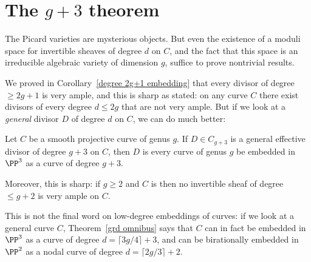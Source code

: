 \section{The $g+3$ theorem}\label{g+3 section}

The Picard varieties are mysterious objects.  But even the 
existence of
a  moduli space for invertible sheaves of degree $d$ on $C$, and 
the fact
that this space is an irreducible algebraic variety of dimension $g$,
suffice to prove nontrivial results. 

We proved in Corollary~\ref{degree 2g+1 embedding} that every divisor
of degree $\geq 2g+1$ is very ample, and this is sharp as stated: on
any curve $C$ there exist divisors of every degree $d \leq 2g$ that
are not very ample. But if we look at a \emph{general} divisor $D$ of
degree $d$ on  $C$, we can do much better: 

\begin{theorem}[$g+3$ theorem]\label{g+3 theorem}
Let $C$ be a smooth projective curve of genus $g$. If $D \in C_{g+3}$
is a general effective divisor of degree $g+3$ on $C$, then $D$ is 
%
%
every curve of genus $g$ 
be embedded in $\PP^3$ as a curve of degree $g+3$.

Moreover, this is sharp: if $g\geq 2$ and $C$ is 
%
then no invertible sheaf of degree $\leq g+2$ is very ample on $C$.
\end{theorem}

This is not the final word on low-degree embeddings of curves: if we look at a general curve $C$, Theorem~\ref{grd omnibus} says that $C$ can in fact be embedded in $\PP^{3}$ as a curve of degree $d = \lceil 3g/4 \rceil + 3$, and can be birationally embedded in $\PP^2$ as a nodal curve of degree $d = \lceil 2g/3 \rceil + 2$.


